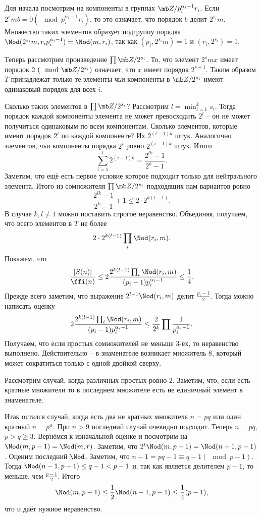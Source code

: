 Для начала посмотрим на компоненты в группах $\mb Z/p_i^{\alpha_i-1}r_i$. Если $2^smb=0 (\mod p_i^{\alpha_i-1}r_i)$, то это означает, что порядок $b$ делит $2^{s_i}m$. Множество таких элементов образует подгруппу порядка $\Nod(2^{s_i}m,r_ip_i^{\alpha_i-1})=\Nod(m,r_i)$, так как $(p_i,2^{s_i}m)=1$ и $(r_i,2^{s_i})=1$.

Теперь рассмотрим произведение $\prod \mb Z/2^{s_i}$. То, что элемент $2^{s}mx$ имеет порядок 2 $(\mod \mb Z/2^{s_i})$ означает, что $x$ имеет порядок $2^{s+1}$. Таким образом $T$ принадлежат только те элементы чьи компоненты в $\mb Z/2^{s_i}$ имеют одинаковый порядок для всех $i$.

Сколько таких элементов в $\prod \mb Z/2^{s_i}$? Рассмотрим $l= \min_{i=1}^k s_i$. Тогда порядок каждой компоненты элемента не может превосходить $2^l$ -- он не может получиться одинаковым по всем компонентам. Сколько элементов, которые имеют порядок $2^l$ по каждой компоненте? Их $2^{(l-1)k}$ штук. Аналогично элементов, чьи компоненты порядка  $2^i$ ровно $2^{(i-1)k}$ штук. Итого
$$\sum_{i=1}^l 2^{(i-1)k}= \frac{2^{lk}-1}{2^k-1}.$$ Заметим, что ещё есть первое условие которое подходит только для нейтрального элемента. Итого из сомножителя $\prod \mb Z/2^{s_i}$  подходящих нам вариантов ровно $$\frac{2^{lk}-1}{2^k-1}+1\leq 2\cdot 2^{k(l-1)}.$$
В случае $k,l\neq 1$ можно поставить строгое неравенство. Объединяя, получаем, что всего элементов в $T$ не более
$$2\cdot 2^{k(l-1)}\prod_i\Nod(r_i,m).$$
Покажем, что 
$$\frac{|S(n)|}{\ffi(n)}\leq 2\frac{ 2^{k(l-1)}\prod_i\Nod(r_i,m)}{(p_i-1)p_i^{\alpha_i-1}}\leq \frac{1}{4}.$$
Прежде всего заметим, что выражение $2^{l-1}\Nod(r_i,m)$ делит $\frac{p_i-1}{2}$.
Тогда можно написать оценку
$$2\frac{ 2^{k(l-1)}\prod_i\Nod(r_i,m)}{(p_i-1)p_i^{\alpha_i-1}}\leq \frac{2}{2^k}\prod \frac{1}{p_i^{\alpha_i-1}}.$$
Получаем, что если простых сомножителей не меньше 3-ёх, то неравенство выполнено. Действительно -- в знаменателе возникает множитель $8$, который может сократиться только с одной двойкой сверху. 

Рассмотрим случай, когда различных простых ровно 2. Заметим, что, если есть кратные множители то в последнем множителе есть не единичный элемент в знаменателе. 

Итак остался случай, когда есть два  не кратных множителя $n=pq$ или один кратный $n=p^{\alpha}$. При $n>9$  последний случай очевидно подходит. Теперь $n=pq$, $p>q\geq 3$. Вернёмся к изначальной оценке и посмотрим на $\Nod (m,p-1)=\Nod(m,r)$. Заметим, что $2^t \Nod (m,p-1)= \Nod(n-1,p-1)$. Оценим последний $\Nod$. Заметим, что $n-1=pq-1\equiv q-1 (\mod p-1)$.
Тогда $\Nod(n-1,p-1)\leq q-1 < p-1$ и, так как является делителем $p-1$, то меньше, чем $\frac{p-1}{2}$. 
Итого $$\Nod (m,p-1)\leq \frac{1}{2}\Nod (n-1,p-1)\leq\frac{1}{4}(p-1),$$
что и даёт нужное неравенство.
\endproof


